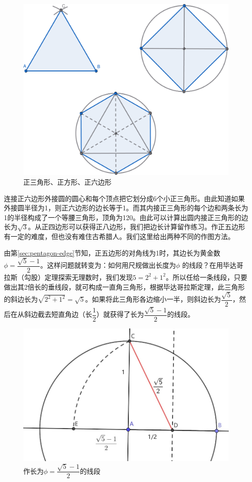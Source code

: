 \documentclass[b5paper]{ctexart}
\begin{document}
\begin{figure}[htbp]
 \centering
 \includegraphics[scale=0.35]{img/polygon}
 \caption{正三角形、正方形、正六边形}
 \label{fig:polygon}
\end{figure}

连接正六边形外接圆的圆心和每个顶点把它划分成6个小正三角形。由此知道如果外接圆半径为1，则正六边形的边长等于1。而其内接正三角形的每个边和两条长为1的半径构成了一个等腰三角形，顶角为120\degree。由此可以计算出圆内接正三角形的边长为$\sqrt{3}$。从正四边形可以获得正八边形，我们把边长计算留作练习。作正五边形有一定的难度，但也没有难住古希腊人。我们这里给出两种不同的作图方法。

由第\ref{sec:pentagon-edge}节知，正五边形的对角线为1时，其边长为黄金数$\phi = \dfrac{\sqrt{5}-1}{2}$。这样问题就转变为：如何用尺规做出长度为$\phi$ 的线段？在用毕达哥拉斯（勾股）定理探索无理数时，我们发现$5 = 2^2 + 1^2$。所以任给一条线段，只要做出其2倍长的垂线段，就可构成一直角三角形，根据毕达哥拉斯定理，此三角形的斜边长为$\sqrt{2^2 + 1^2} = \sqrt{5}$。如果将此三角形各边缩小一半，则斜边长为$\dfrac{\sqrt{5}}{2}$，然后在从斜边截去短直角边（长$\dfrac{1}{2}$）就获得了长为$\dfrac{\sqrt{5}-1}{2}$的线段。

\begin{figure}[htbp]
 \centering
 \includegraphics[scale=0.3]{img/phi}
 \caption{作长为$\phi = \dfrac{\sqrt{5} - 1}{2}$的线段}
 \label{fig:phi}
\end{figure}
\end{document}
